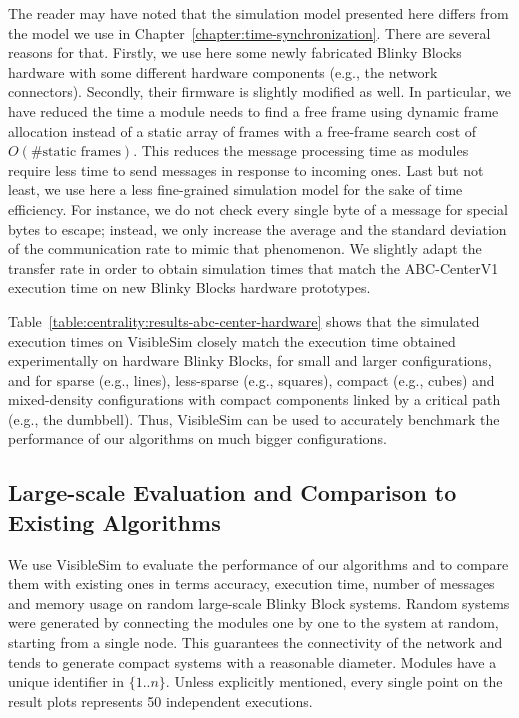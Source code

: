 The reader may have noted that the simulation model presented here differs from the model we use in Chapter~\ref{chapter:time-synchronization}. There are several reasons for that. Firstly, we use here some newly fabricated Blinky Blocks hardware with some different hardware components (e.g., the network connectors). Secondly, their firmware is slightly modified as well. In particular, we have reduced the time a module needs to find a free frame using dynamic frame allocation instead of a static array of frames with a free-frame search cost of $O(\text{\# static frames})$. This reduces the message processing time as modules require less time to send messages in response to incoming ones. Last but not least, we use here a less fine-grained simulation model for the sake of time efficiency. For instance, we do not check every single byte of a message for special bytes to escape; instead, we only increase the average and the standard deviation of the communication rate to mimic that phenomenon. We slightly adapt the transfer rate in order to obtain simulation times that match the ABC-CenterV1 execution time on new Blinky Blocks hardware prototypes.

Table~\ref{table:centrality:results-abc-center-hardware} shows that the simulated execution times on VisibleSim closely match the execution time obtained experimentally on hardware Blinky Blocks, for small and larger configurations, and for sparse (e.g., lines), less-sparse (e.g., squares), compact (e.g., cubes) and mixed-density configurations with compact components linked by a critical path (e.g., the dumbbell). Thus, VisibleSim can be used to accurately benchmark the performance of our algorithms on much bigger configurations.

\subsection{Large-scale Evaluation and Comparison to Existing Algorithms}

We use VisibleSim to evaluate the performance of our algorithms and to compare them with existing ones in terms accuracy, execution time, number of messages and memory usage on random large-scale Blinky Block systems. Random systems were generated by connecting the modules one by one to the system at random, starting from a single node. This guarantees the connectivity of the network and tends to generate compact systems with a reasonable diameter. Modules have a unique identifier in  $\{1..n\}$. Unless explicitly mentioned, every single point on the result plots represents 50 independent executions.

